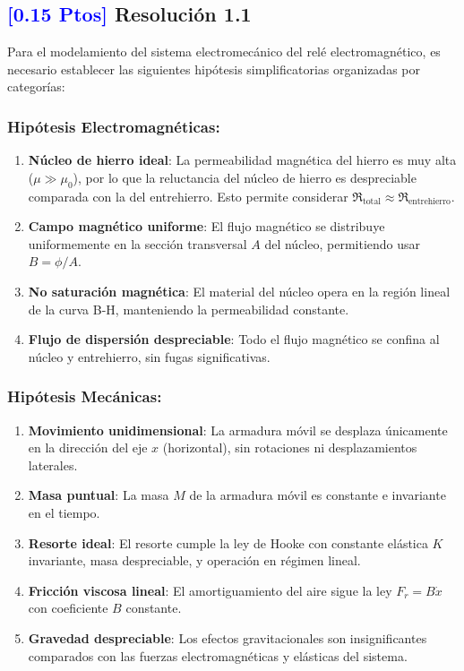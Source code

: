 \documentclass[
  11pt,
  letterpaper,
   addpoints,
   answers
  ]{exam}
\newcommand{\Rel}{\mathfrak{R}} %
\begin{document}
\begin{solution}
  \subsection*{\textcolor{blue}{[0.15 Ptos]} Resolución 1.1}

    Para el modelamiento del sistema electromecánico del relé electromagnético, es necesario establecer las siguientes hipótesis simplificatorias organizadas por categorías:

    \subsubsection*{Hipótesis Electromagnéticas:}
    \begin{enumerate}
      \item \textbf{Núcleo de hierro ideal}: La permeabilidad magnética del hierro es muy alta ($\mu \gg \mu_0$), por lo que la reluctancia del núcleo de hierro es despreciable comparada con la del entrehierro. Esto permite considerar $\Rel_{\text{total}} \approx \Rel_{\text{entrehierro}}$.
      \item \textbf{Campo magnético uniforme}: El flujo magnético se distribuye uniformemente en la sección transversal $A$ del núcleo, permitiendo usar $B = \phi/A$.
      \item \textbf{No saturación magnética}: El material del núcleo opera en la región lineal de la curva B-H, manteniendo la permeabilidad constante.
      \item \textbf{Flujo de dispersión despreciable}: Todo el flujo magnético se confina al núcleo y entrehierro, sin fugas significativas.
    \end{enumerate}

    \subsubsection*{Hipótesis Mecánicas:}
    \begin{enumerate}
      \item \textbf{Movimiento unidimensional}: La armadura móvil se desplaza únicamente en la dirección del eje $x$ (horizontal), sin rotaciones ni desplazamientos laterales.
      \item \textbf{Masa puntual}: La masa $M$ de la armadura móvil es constante e invariante en el tiempo.
      \item \textbf{Resorte ideal}: El resorte cumple la ley de Hooke con constante elástica $K$ invariante, masa despreciable, y operación en régimen lineal.
      \item \textbf{Fricción viscosa lineal}: El amortiguamiento del aire sigue la ley $F_r = B\dot{x}$ con coeficiente $B$ constante.
      \item \textbf{Gravedad despreciable}: Los efectos gravitacionales son insignificantes comparados con las fuerzas electromagnéticas y elásticas del sistema.
    \end{enumerate}


\end{solution}
\end{document}
